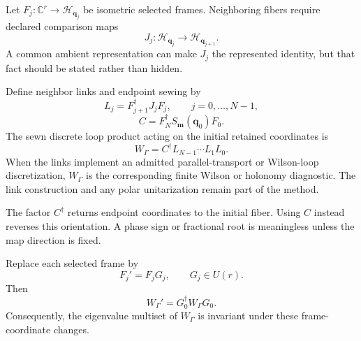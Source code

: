 Let \(F_j:\mathbb C^r\to\mathcal H_{\mathbf q_j}\) be isometric selected
frames. Neighboring fibers require declared comparison maps
\begin{equation}
  J_j:\mathcal H_{\mathbf q_j}
  \longrightarrow\mathcal H_{\mathbf q_{j+1}}.
\end{equation}
A common ambient representation can make \(J_j\) the represented identity, but
that fact should be stated rather than hidden.

\begin{definition}
\label{def:training-sewn-discrete-loop-product}
Define neighbor links and endpoint sewing by
\begin{equation}
  L_j=F_{j+1}^{\dagger}J_jF_j,
  \qquad j=0,\ldots,N-1,
  \label{eq:training-neighbor-link}
\end{equation}
\begin{equation}
  C=F_N^{\dagger}S_{\mathbf m}(\mathbf q_0)F_0.
  \label{eq:training-endpoint-sewing-link}
\end{equation}
The sewn discrete loop product acting on the initial retained coordinates is
\begin{equation}
  W_{\Gamma}
  =C^{\dagger}L_{N-1}\cdots L_1L_0.
  \label{eq:training-sewn-loop-product}
\end{equation}
When the links implement an admitted parallel-transport or Wilson-loop
discretization, \(W_{\Gamma}\) is the corresponding finite Wilson or holonomy
diagnostic. The link construction and any polar unitarization remain part of
the method.
\end{definition}

The factor \(C^{\dagger}\) returns endpoint coordinates to the initial fiber.
Using \(C\) instead reverses this orientation. A phase sign or fractional root
is meaningless unless the map direction is fixed.

\begin{proposition}
\label{prop:training-sewn-loop-gauge-covariance}
Replace each selected frame by
\begin{equation}
  F_j'=F_jG_j,
  \qquad G_j\in U(r).
\end{equation}
Then
\begin{equation}
  W_{\Gamma}'=G_0^{\dagger}W_{\Gamma}G_0.
  \label{eq:training-sewn-loop-covariance}
\end{equation}
Consequently, the eigenvalue multiset of \(W_{\Gamma}\) is invariant under
these frame-coordinate changes.
\end{proposition}

